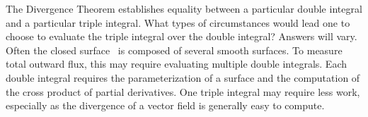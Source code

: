{The Divergence Theorem establishes equality between a particular double integral and a particular triple integral. What types of circumstances would lead one to choose to evaluate the triple integral over the double integral? 
}
{Answers will vary. Often the closed surface \surfaceS\ is composed of several smooth surfaces. To measure total outward flux, this may require evaluating multiple double integrals. Each double integral requires the parameterization of a surface and the computation of the cross product of partial derivatives. One triple integral may require less work, especially as the divergence of a vector field is generally easy to compute.
}
